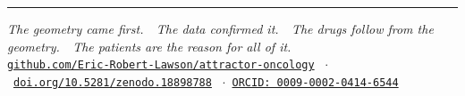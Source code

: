 \documentclass[9.5pt, a4paper]{article}
\begin{document}
\vspace{0.1em}
\noindent\textcolor{rulecolor}
{\rule{\linewidth}{0.4pt}}

\begin{center}
\footnotesize
\textit{The geometry came first.\ \
The data confirmed it.\ \
The drugs follow from the geometry.\ \
The patients are the reason for all of it.}\\[0.2em]
\href{https://github.com/Eric-Robert-Lawson/attractor-oncology}
{\texttt{github.com/Eric-Robert-Lawson/attractor-oncology}}
\ $\cdot$\
\href{https://doi.org/10.5281/zenodo.18898788}
{\texttt{doi.org/10.5281/zenodo.18898788}}
\ $\cdot$\
\href{https://orcid.org/0009-0002-0414-6544}
{\texttt{ORCID: 0009-0002-0414-6544}}
\end{center}
\end{document}
